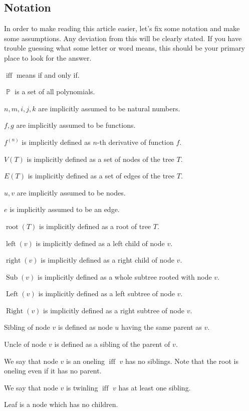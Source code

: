 \documentclass[final]{article}
\theoremstyle{definition}
\theoremstyle{remark}
\DeclareMathOperator{\textiff}{\text{iff}}
\DeclareMathOperator{\poly}{\mathbb{P}}
\DeclareMathOperator{\troot}{\text{root}}
\DeclareMathOperator{\tleft}{\text{left}}
\DeclareMathOperator{\tright}{\text{right}}
\DeclareMathOperator{\tLeft}{\text{Left}}
\DeclareMathOperator{\tRight}{\text{Right}}
\DeclareMathOperator{\tSub}{\text{Sub}}
\begin{document}
\subsection{Notation}%
\label{sub:notation}

In order to make reading this article easier, let's fix some notation and make some assumptions. Any deviation from this will be clearly stated. If you have trouble guessing what some letter or word means, this should be your primary place to look for the answer.

\(\textiff\) means if and only if.

\(\poly\) is a set of all polynomials.

\(n, m, i, j, k\) are implicitly assumed to be natural numbers.

\(f, g\) are implicitly assumed to be functions.

\(f^{(n)}\) is implicitly defined as \(n\)-th derivative of function \(f\).

\(V(T)\) is implicitly defined as a set of nodes of the tree \(T\).

\(E(T)\) is implicitly defined as a set of edges of the tree \(T\).

\(u, v\) are implicitly assumed to be nodes.

\(e\) is implicitly assumed to be an edge.

\(\troot(T)\) is implicitly defined as a root of tree \(T\).

\(\tleft(v)\) is implicitly defined as a left child of node \(v\).

\(\tright(v)\) is implicitly defined as a right child of node \(v\).

\(\tSub(v)\) is implicitly defined as a whole subtree rooted with node \(v\).

\(\tLeft(v)\) is implicitly defined as a left subtree of node \(v\).

\(\tRight(v)\) is implicitly defined as a right subtree of node \(v\).

Sibling of node \(v\) is defined as node \(u\) having the same parent as \(v\).

Uncle of node \(v\) is defined as a sibling of the parent of \(v\).

We say that node \(v\) is an oneling \(\textiff\) \(v\) has no siblings. Note that the root is oneling even if it has no parent.

We say that node \(v\) is twinling \(\textiff\) \(v\) has at least one sibling.

Leaf is a node which has no children.
\end{document}
